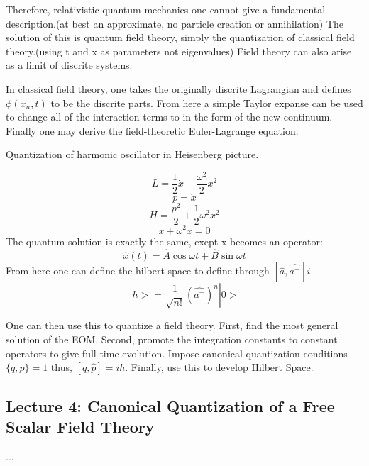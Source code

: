 Therefore, relativistic quantum mechanics one cannot give a fundamental description.(at best an approximate, no particle creation or annihilation) The solution of this is quantum field theory, simply the quantization of classical field theory.(using t and x as parameters not eigenvalues) Field theory can also arise as a limit of discrite systems.

In classical field theory, one takes the originally discrite Lagrangian and defines $\phi(x_n,t)$ to be the discrite parts. From here a simple Taylor expanse can be used to change all of the interaction terms to in the form of the new continuum. Finally one may derive the field-theoretic Euler-Lagrange equation.

Quantization of harmonic oscillator in Heisenberg picture.

\[
L=\frac 1 2 \dot{x} - \frac{\omega^2}{2}x^2
  \]
\[
p=\dot{x}
  \]
\[
H=\frac{p^2}{2}+\frac 1 2 \omega^2x^2
  \]
\[
\ddot{x}+\omega^2x=0
  \]
  The quantum solution is exactly the same, exept x becomes an operator:
\[
\hat{x}(t)= \hat{A}\cos{\omega t} + \hat{B} \sin{\omega t}
  \]
  From here one can define the hilbert space to define through $ [\hat{a}, \hat{a^+} ] i$
\[
|h>= \frac{1}{\sqrt{n!}}(\hat{a^+})^n | 0>
  \]

  One can then use this to quantize a field theory. First, find the most general solution of the EOM. Second, promote the integration constants to constant operators to give full time evolution. Impose canonical quantization conditions$\{q,p \}=1$ thus, $ [\hat{q}, \hat{p} ]= ih$. Finally, use this to develop Hilbert Space.

\subsection{Lecture 4: Canonical Quantization of a Free Scalar Field Theory}

...
